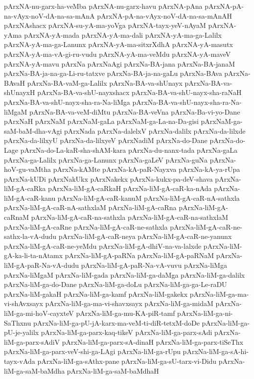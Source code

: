 {pArxNA-nu-garx-ha-veMba
pArxNA-nu-garx-havu
pArxNA-pAna
pArxNA-pA-na-vAyx-noV-dA-na-sa-mAnA
pArxNA-pA-na-vAyx-noV-dA-na-sa-mAnAH
pArxNAshacx
pArxNA-su-yA-ma-yoVga
pArxNA-tayx-yeV-nAyaM
pArxNA-yAma
pArxNA-yA-mada
pArxNA-yA-ma-dali
pArxNA-yA-ma-ga-Lalilx
pArxNA-yA-ma-ga-Lanunx
pArxNA-yA-ma-sitxrXdhA
pArxNA-yA-masutx
pArxNA-yA-ma-vA-gi-ru-vudu
pArxNA-yA-ma-veMdu
pArxNA-yA-maveV
pArxNA-yA-mavu
pArxNa
pArxNaAgi
pArxNa-BA-jana
pArxNa-BA-janaM
pArxNa-BA-ja-na-ga-Li-ru-tatxve
pArxNa-BA-ja-na-gaLu
pArxNa-BAva
pArxNa-BAvaH
pArxNa-BA-vaM-ga-Lalilx
pArxNa-BA-va-shUnayx
pArxNa-BA-va-shUnayxH
pArxNa-BA-va-shU-nayxshacx
pArxNa-BA-va-shU-nayx-sha-raNaH
pArxNa-BA-va-shU-nayx-sha-ra-Na-liMga
pArxNa-BA-va-shU-nayx-sha-ra-Na-liMgaM
pArxNa-BA-va-veM-diMtu
pArxNa-BA-veVna
pArxNa-Ba-vi-yo-Dane
pArxNaH
pArxNaM
pArxNaM-gaLa
pArxNaM-ga-La-na-Da-gisi
pArxNaM-ga-saM-baM-dha-vAgi
pArxNada
pArxNa-dalelxV
pArxNa-dalilx
pArxNa-da-lilxde
pArxNa-da-lilxyU
pArxNa-da-lilxyeV
pArxNadiM
pArxNa-do-Dane
pArxNa-do-Lage
pArxNa-do-La-kaR-sha-shAM-kara
pArxNa-du-nanx-tada
pArxNa-gaLa
pArxNa-ga-Lalilx
pArxNa-ga-Lanunx
pArxNa-gaLeV
pArxNa-guNa
pArxNa-hoV-gu-vaMtha
pArxNa-kAMte
pArxNa-kA-paR-Nayxva
pArxNa-kA-ya-rUpa
pArxNa-kUDi
pArxNakUkx
pArxNakekx
pArxNa-kukx-pa-deV-shava
pArxNa-liM-gA-caRka
pArxNa-liM-gA-caRkaH
pArxNa-liM-gA-caR-ka-nAda
pArxNa-liM-gA-caR-kanu
pArxNa-liM-gA-caR-kanuM
pArxNa-liM-gA-caR-nA-sathxla
pArxNa-liM-gA-caR-nA-sathxlaM
pArxNa-liM-gA-caRna
pArxNa-liM-gA-caRnaM
pArxNa-liM-gA-caR-na-sathxla
pArxNa-liM-gA-caR-na-sathxlaM
pArxNa-liM-gA-caRne
pArxNa-liM-gA-caR-ne-sathxla
pArxNa-liM-gA-caR-ne-sathx-la-vA-dudu
pArxNa-liM-gA-caR-neya
pArxNa-liM-gA-caR-ne-yanunx
pArxNa-liM-gA-caR-ne-yeMdu
pArxNa-liM-gA-dhiV-na-va-lalxde
pArxNa-liM-gA-ka-li-ta-nAtamx
pArxNa-liM-gA-paRNa
pArxNa-liM-gA-paRNaM
pArxNa-liM-gA-paR-Na-vA-dudu
pArxNa-liM-gA-paR-Na-vA-vuvu
pArxNa-liMga
pArxNa-liMgaM
pArxNa-liM-gada
pArxNa-liM-ga-daMga
pArxNa-liM-ga-dalilx
pArxNa-liM-ga-do-Dane
pArxNa-liM-ga-doLu
pArxNa-liM-ga-ga-Le-raDU
pArxNa-liM-gakaH
pArxNa-liM-ga-kamf
pArxNa-liM-gakekx
pArxNa-liM-ga-ma-vi-shAvxsayx
pArxNa-liM-ga-ma-vi-shavxsayx
pArxNa-liM-ga-midaM
pArxNa-liM-ga-mi-hoV-cayxteV
pArxNa-liM-ga-mu-KA-piR-tamf
pArxNa-liM-ga-ni-SaThxnu
pArxNa-liM-ga-pU-jA-karx-ma-veM-ti-diR-tetxM-doDe
pArxNa-liM-ga-pU-je-yalilx
pArxNa-liM-ga-parx-kaq-tikeV
pArxNa-liM-ga-parx-sAdi
pArxNa-liM-ga-parx-sAdiV
pArxNa-liM-ga-parx-sA-dinaH
pArxNa-liM-ga-parx-tiSeThx
pArxNa-liM-ga-parx-veV-shi-ga-LAgi
pArxNa-liM-ga-rUpu
pArxNa-liM-ga-sA-hi-tayx-vAda
pArxNa-liM-ga-sAthx-pane
pArxNa-liM-ga-sU-tarx-vi-Didu
pArxNa-liM-ga-saM-baMdha
pArxNa-liM-ga-saM-baMdhaH
}
